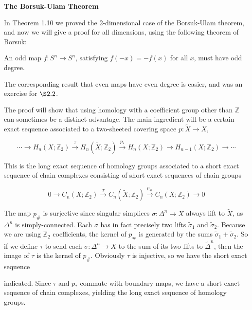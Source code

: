 \textbf{The Borsuk-Ulam Theorem}

In Theorem 1.10 we proved the 2-dimensional case of the Borsuk-Ulam theorem, and now we will give a proof for all dimensions, using the following theorem of Borsuk:

\begin{proposition}
\label{prop:odd-map-odd-degree}
An odd map $f : S^n \to S^n$, satisfying $f(-x) = -f(x)$ for all $x$, must have odd degree.
\end{proposition}

The corresponding result that even maps have even degree is easier, and was an exercise for $\S 2.2$.

The proof will show that using homology with a coefficient group other than $\mathbb{Z}$ can sometimes be a distinct advantage. The main ingredient will be a certain exact sequence associated to a two-sheeted covering space $p : \tilde{X} \to X$,

\[ \cdots \to H_n(X; \mathbb{Z}_2) \xrightarrow{\tau} H_n(\tilde{X}; \mathbb{Z}_2) \xrightarrow{p_*} H_n(X; \mathbb{Z}_2) \to H_{n-1}(X; \mathbb{Z}_2) \to \cdots \]

This is the long exact sequence of homology groups associated to a short exact sequence of chain complexes consisting of short exact sequences of chain groups

\[ 0 \to C_n(X; \mathbb{Z}_2) \xrightarrow{\tau} C_n(\tilde{X}; \mathbb{Z}_2) \xrightarrow{p_\#} C_n(X; \mathbb{Z}_2) \to 0 \]

The map $p_\#$ is surjective since singular simplices $\sigma : \Delta^n \to X$ always lift to $\tilde{X}$, as $\Delta^n$ is simply-connected. Each $\sigma$ has in fact precisely two lifts $\tilde{\sigma}_1$ and $\tilde{\sigma}_2$. Because we are using $\mathbb{Z}_2$ coefficients, the kernel of $p_\#$ is generated by the sums $\tilde{\sigma}_1 + \tilde{\sigma}_2$. So if we define $\tau$ to send each $\sigma : \Delta^n \to X$ to the sum of its two lifts to $\tilde{\Delta}^n$, then the image of $\tau$ is the kernel of $p_\#$. Obviously $\tau$ is injective, so we have the short exact sequence

indicated. Since $\tau$ and $p_*$ commute with boundary maps, we have a short exact sequence of chain complexes, yielding the long exact sequence of homology groups.

